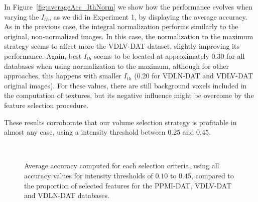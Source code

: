 In Figure~\ref{fig:averageAcc_IthNorm} we show how the performance evolves when varying the $I_{th}$, as we did in Experiment 1, by displaying the average accuracy. As in the previous case, the integral normalization performs similarly to the original, non-normalized images. In this case, the normalization to the maximum strategy seems to affect more the VDLV-DAT dataset, slightly improving its performance. Again, best $I_{th}$ seems to be located at approximately 0.30 for all databases when using normalization to the maximum, although for other approaches, this happens with smaller $I_{th}$ (0.20 for VDLN-DAT and VDLV-DAT original images). For these values, there are still background voxels included in the computation of textures, but its negative influence might be overcome by the feature selection procedure. 

These results corroborate that our volume selection strategy is profitable in almost any case, using a intensity threshold between $0.25$ and $0.45$. 

\begin{figure}
	\centering
	\\
	\caption[Average accuracy computed for each selection criteria over $N$ in Experiment 2.]{Average accuracy computed for each selection criteria, using all accuracy values for intensity thresholds of $0.10$ to $0.45$, compared to the proportion of selected features for the PPMI-DAT, VDLV-DAT and VDLN-DAT databases.}
	\label{fig:experiment4}
\end{figure}


